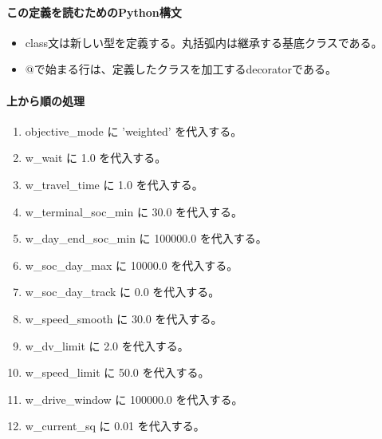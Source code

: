 \documentclass[a4paper,11pt]{article}
\begin{document}
            \paragraph{この定義を読むためのPython構文}
            \begin{itemize}[leftmargin=1.6em]
            \item class文は新しい型を定義する。丸括弧内は継承する基底クラスである。
\item @で始まる行は、定義したクラスを加工するdecoratorである。
            \end{itemize}
            \paragraph{上から順の処理}
            \begin{enumerate}[leftmargin=1.8em]
            \item objective\_mode に 'weighted' を代入する。
\item w\_wait に 1.0 を代入する。
\item w\_travel\_time に 1.0 を代入する。
\item w\_terminal\_soc\_min に 30.0 を代入する。
\item w\_day\_end\_soc\_min に 100000.0 を代入する。
\item w\_soc\_day\_max に 10000.0 を代入する。
\item w\_soc\_day\_track に 0.0 を代入する。
\item w\_speed\_smooth に 30.0 を代入する。
\item w\_dv\_limit に 2.0 を代入する。
\item w\_speed\_limit に 50.0 を代入する。
\item w\_drive\_window に 100000.0 を代入する。
\item w\_current\_sq に 0.01 を代入する。
            \end{enumerate}
\end{document}
